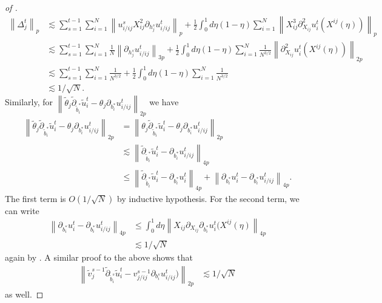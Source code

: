 \documentclass[10pt,a4paper]{amsart}
\newcommand{\norm}[1]{\left\lVert#1\right\rVert}
\begin{document}
\begin{proof}[of ]
\begin{align*}
        \norm{\Delta_j^t}_p &\lesssim  \sum_{s=1}^{t-1} \sum_{i=1}^N \norm{u^{s}_{i/ij}X_{ij}^2\partial_{h_j^s}u_{i/ij}^{t}   }_p+ \frac{1}{2} \int_0^1 d\eta(1-\eta) \sum_{i=1}^N \norm{X_{ij}^3 \partial^2_{X_{ij}}u_i^{t}(X^{ij}(\eta))}_p \\
        &\lesssim \sum_{s=1}^{t-1} \sum_{i=1}^N \frac{1}{N}\norm{\partial_{h_j^s}u_{i/ij}^{t}   }_{3p}+ \frac{1}{2} \int_0^1 d\eta(1-\eta) \sum_{i=1}^N \frac{1}{N^{3/2}}\norm{\partial^2_{X_{ij}}u_i^{t}(X^{ij}(\eta))}_{2p} \\
         &\lesssim \sum_{s=1}^{t-1} \sum_{i=1}^N \frac{1}{N^{3/2}}+ \frac{1}{2} \int_0^1 d\eta(1-\eta) \sum_{i=1}^N \frac{1}{N^{3/2}} \\
         &\lesssim 1/\sqrt{N}.
    \end{align*}
    Similarly, for $\norm{ \tilde{\theta}_j \tilde{\partial}_{\tilde{b}_i^*} \tilde{u}_i^t - \theta_j \partial_{b_i^*}u_{i/ij}^t }_{2p}$ we have
    \begin{align*}
        \norm{ \tilde{\theta}_j \tilde{\partial}_{\tilde{b}_i^*} \tilde{u}_i^t - \theta_j \partial_{b_i^*}u_{i/ij}^t }_{2p} &= \norm{ \theta_j \tilde{\partial}_{\tilde{b}_i^*} \tilde{u}_i^t - \theta_j \partial_{b_i^*}u_{i/ij}^t }_{2p} \\
        &\lesssim \norm{  \tilde{\partial}_{\tilde{b}_i^*} \tilde{u}_i^t - \partial_{b_i^*}u_{i/ij}^t }_{4p} \\
        &\leq \norm{  \tilde{\partial}_{\tilde{b}_i^*} \tilde{u}_i^t - \partial_{b_i^*}u_{i}^t }_{4p} + \norm{\partial_{b_i^*}u_{i}^t - \partial_{b_i^*}u_{i/ij}^t}_{4p}.
    \end{align*}
    The first term is $O( 1/\sqrt{N})$ by inductive hypothesis. For the second term, we can write 
    \begin{align}
        \norm{\partial_{b_i^*}u_{i}^t - \partial_{b_i^*}u_{i/ij}^t}_{4p} &\leq \int_0^1d\eta \norm{X_{ij} \partial_{X_{ij}}\partial_{b_i^*}u_{i}^t(X^{ij}(\eta)}_{4p}\label{eq:taylor-expansion-to-put-xij-back} \\
        &\lesssim 1/\sqrt{N}\nonumber
    \end{align}
    again by . A similar proof to the above shows that 
    \begin{align*}
        \norm{\tilde{v}_j^{s-1} \tilde{\partial}_{\tilde{b}_i^s} \tilde{u}_i^t - v_{j/ij}^{s-1} \partial_{b_i^s}u_{i/ij}^t )}_{2p} &\lesssim 1/\sqrt{N}
    \end{align*}
    as well.


\end{proof}
\end{document}
